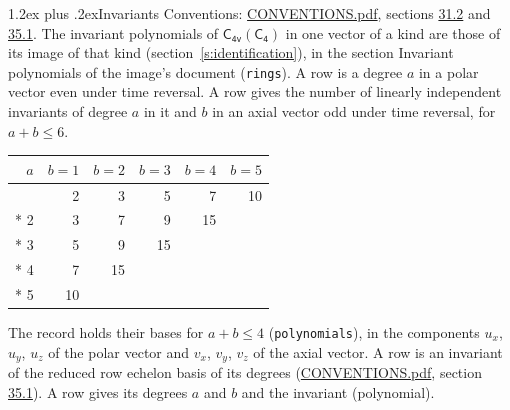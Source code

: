 \documentclass[10pt,a4paper]{article}
\makeatletter
\renewcommand\section{\@startsection{section}{1}{\z@}{-3ex plus -1ex minus -.2ex}%
  {1.2ex plus .2ex}{\normalfont\large\sffamily\bfseries\color{parttitle}}}
\numberwithin{equation}{section}
\newcommand{\grp}[1]{\mathsf{#1}}
\makeatother
\begin{document}
\section{Invariants}\label{s:invariants}
Conventions: \href{../../CONVENTIONS.pdf}{CONVENTIONS.pdf}, sections \href{../../CONVENTIONS.pdf\#conv.31.2}{31.2} and \href{../../CONVENTIONS.pdf\#conv.35.1}{35.1}.
The invariant polynomials of $\grp{C_{4v}}(\grp{C_{4}})$ in one vector of a kind are those of its image of that kind (section~\ref{s:identification}), in the section Invariant polynomials of the image's document (\texttt{rings}).
\leavevmode\label{n:index.degree.polar}\label{n:index.degree.axial}A row is a degree $a$ in a polar vector even under time reversal. A row gives the number of linearly independent invariants of degree $a$ in it and $b$ in an axial vector odd under time reversal, for $a + b \le 6$.
{\small\begin{longtable}{@{}rrrrrr@{}}\toprule
$a$ & $b = 1$ & $b = 2$ & $b = 3$ & $b = 4$ & $b = 5$\\\midrule\endhead
\bottomrule\endfoot\endlastfoot
1 & 2 & 3 & 5 & 7 & 10\\*
2 & 3 & 7 & 9 & 15 & \\*
3 & 5 & 9 & 15 &  & \\*
4 & 7 & 15 &  &  & \\*
5 & 10 &  &  &  & \\
\bottomrule\end{longtable}}
\leavevmode\label{n:local.component.polar}\label{n:local.component.axial}The record holds their bases for $a + b \le 4$ (\texttt{polynomials}), in the components $u_{x}$, $u_{y}$, $u_{z}$ of the polar vector and $v_{x}$, $v_{y}$, $v_{z}$ of the axial vector. \label{n:head.polynomial}A row is an invariant of the reduced row echelon basis of its degrees (\href{../../CONVENTIONS.pdf}{CONVENTIONS.pdf}, section \href{../../CONVENTIONS.pdf\#conv.35.1}{35.1}). A row gives its degrees $a$ and $b$ and the invariant (polynomial).
\end{document}
